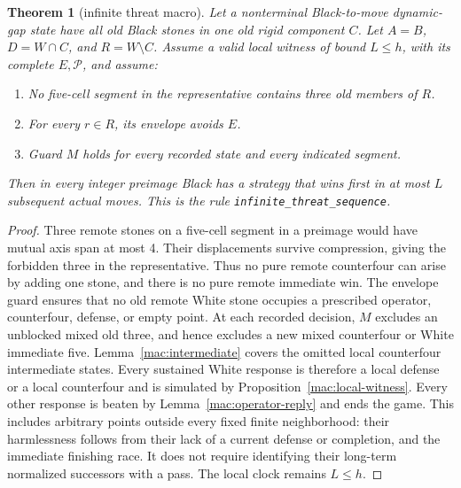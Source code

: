 \documentclass[11pt]{article}
\newtheorem{theorem}{Theorem}[section]
\theoremstyle{definition}
\theoremstyle{remark}
\begin{document}
\begin{theorem}[infinite threat macro]\label{mac:infinite}
Let a nonterminal Black-to-move dynamic-gap state have all old Black stones in one old rigid component \(C\). Let \(A=B\), \(D=W\cap C\), and \(R=W\setminus C\). Assume a valid local witness of bound \(L\le h\), with its complete \(E,\mathcal P\), and assume:

\begin{enumerate}
\item No five-cell segment in the representative contains three old members of \(R\).
\item For every \(r\in R\), its envelope avoids \(E\).
\item Guard \(M\) holds for every recorded state and every indicated segment.

\end{enumerate}
Then in every integer preimage Black has a strategy that wins first in at most \(L\) subsequent actual moves. This is the rule \texttt{infinite\_threat\_sequence}.

\end{theorem}
\begin{proof}
Three remote stones on a five-cell segment in a preimage would have mutual axis span at most 4. Their displacements survive compression, giving the forbidden three in the representative. Thus no pure remote counterfour can arise by adding one stone, and there is no pure remote immediate win. The envelope guard ensures that no old remote White stone occupies a prescribed operator, counterfour, defense, or empty point. At each recorded decision, \(M\) excludes an unblocked mixed old three, and hence excludes a new mixed counterfour or White immediate five. Lemma~\ref{mac:intermediate} covers the omitted local counterfour intermediate states. Every sustained White response is therefore a local defense or a local counterfour and is simulated by Proposition~\ref{mac:local-witness}. Every other response is beaten by Lemma~\ref{mac:operator-reply} and ends the game. This includes arbitrary points outside every fixed finite neighborhood: their harmlessness follows from their lack of a current defense or completion, and the immediate finishing race. It does not require identifying their long-term normalized successors with a pass. The local clock remains \(L\le h\). 
\end{proof}
\end{document}
